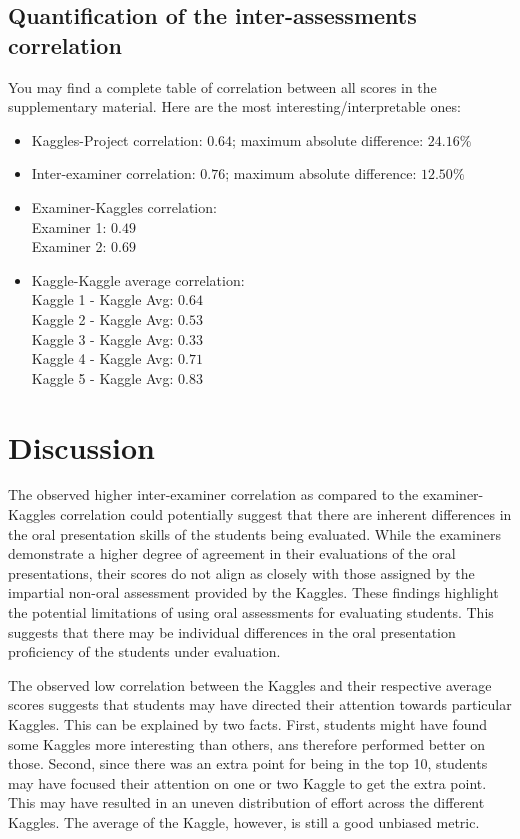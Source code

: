 \documentclass[a4paper]{article}
\begin{document}
	\subsection{Quantification of the inter-assessments correlation}
	You may find a complete table of correlation between all scores in the supplementary material.
	Here are the most interesting/interpretable ones:
	\begin{itemize}
		\item Kaggles-Project correlation: $0.64$; maximum absolute difference: $24.16\%$
		\item Inter-examiner correlation: $0.76$; maximum absolute difference: $12.50\%$
		\item Examiner-Kaggles correlation:\\
		Examiner 1: $0.49$\\
		Examiner 2: $0.69$
		\item Kaggle-Kaggle average correlation:\\
		Kaggle 1 - Kaggle Avg: $0.64$\\
		Kaggle 2 - Kaggle Avg: $0.53$\\
		Kaggle 3 - Kaggle Avg: $0.33$\\
		Kaggle 4 - Kaggle Avg: $0.71$\\
		Kaggle 5 - Kaggle Avg: $0.83$
	\end{itemize}
	
	
	\section{Discussion}
	The observed higher inter-examiner correlation as compared to the examiner-Kaggles correlation could potentially suggest that there are inherent differences in the oral presentation skills of the students being evaluated.
	While the examiners demonstrate a higher degree of agreement in their evaluations of the oral presentations, their scores do not align as closely with those assigned by the impartial non-oral assessment provided by the Kaggles.
	These findings highlight the potential limitations of using oral assessments for evaluating students.
	This suggests that there may be individual differences in the oral presentation proficiency of the students under evaluation.
	
	The observed low correlation between the Kaggles and their respective average scores suggests that students may have directed their attention towards particular Kaggles.
	This can be explained by two facts.
	First, students might have found some Kaggles more interesting than others, ans therefore performed better on those.
	Second, since there was an extra point for being in the top 10, students may have focused their attention on one or two Kaggle to get the extra point.
	This may have resulted in an uneven distribution of effort across the different Kaggles.
	The average of the Kaggle, however, is still a good unbiased metric.
	
\end{document}
